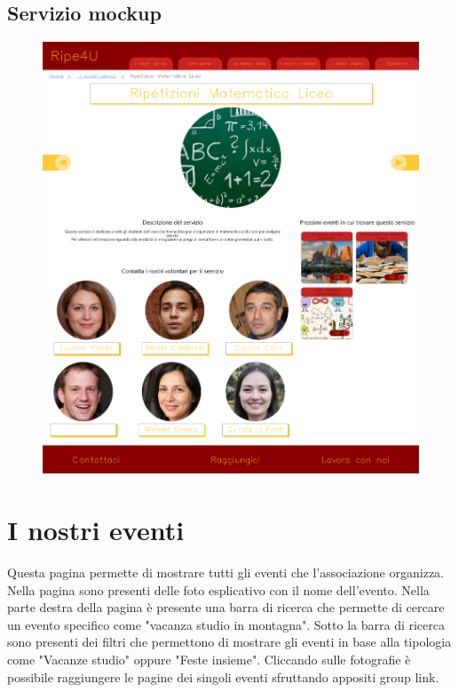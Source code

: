         \subsection{Servizio mockup}
        \begin{figure}[H]
            \centering
            \includegraphics[scale=0.18]{resources/images/servizio-mockup.png}
        \end{figure}

    \newpage    
    \section{I nostri eventi}
    Questa pagina permette di mostrare tutti gli eventi che l'associazione
    organizza. Nella pagina sono presenti delle foto esplicativo con il nome
    dell'evento. Nella parte destra della pagina è presente una barra di ricerca
    che permette di cercare un evento specifico come "vacanza studio in
    montagna". Sotto la barra di ricerca sono presenti dei filtri che permettono
    di mostrare gli eventi in base alla tipologia come "Vacanze studio" oppure
    "Feste insieme". Cliccando sulle fotografie è possibile raggiungere le
    pagine dei singoli eventi sfruttando appositi group link.

